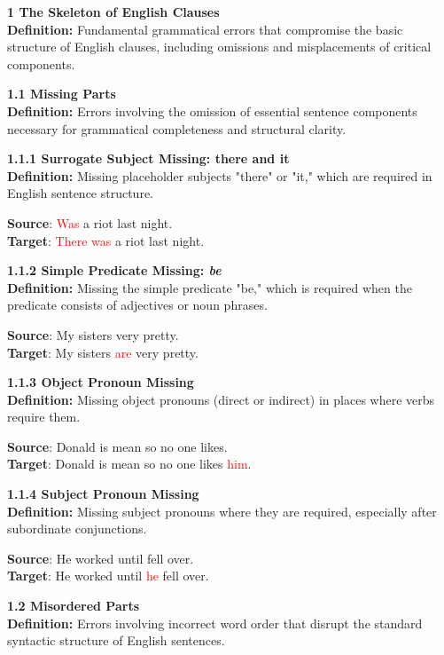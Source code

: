 \begin{tcolorbox}[breakable]
\noindent \textbf{1 The Skeleton of English Clauses}\\
\textbf{Definition:} Fundamental grammatical errors that compromise the basic structure of English clauses, including omissions and misplacements of critical components.

\noindent \textbf{1.1 Missing Parts}\\
\textbf{Definition:} Errors involving the omission of essential sentence components necessary for grammatical completeness and structural clarity.

\noindent \textbf{1.1.1 Surrogate Subject Missing: there and it}\\
\textbf{Definition:} Missing placeholder subjects "there" or "it," which are required in English sentence structure.


\textbf{Source}: \textcolor{red}{Was} a riot last night. \\
\textbf{Target}: \textcolor{red}{There was} a riot last night.


\noindent \textbf{1.1.2 Simple Predicate Missing: \textit{be}}\\
\textbf{Definition:} Missing the simple predicate "be," which is required when the predicate consists of adjectives or noun phrases.


\textbf{Source}: My sisters very pretty. \\
\textbf{Target}: My sisters \textcolor{red}{are} very pretty.


\noindent \textbf{1.1.3 Object Pronoun Missing}\\
\textbf{Definition:} Missing object pronouns (direct or indirect) in places where verbs require them.


\textbf{Source}: Donald is mean so no one likes. \\
\textbf{Target}: Donald is mean so no one likes \textcolor{red}{him}.


\noindent \textbf{1.1.4 Subject Pronoun Missing}\\
\textbf{Definition:} Missing subject pronouns where they are required, especially after subordinate conjunctions.


\textbf{Source}: He worked until fell over. \\
\textbf{Target}: He worked until \textcolor{red}{he} fell over.


\noindent \textbf{1.2 Misordered Parts}\\
\textbf{Definition:} Errors involving incorrect word order that disrupt the standard syntactic structure of English sentences.


\end{tcolorbox}
